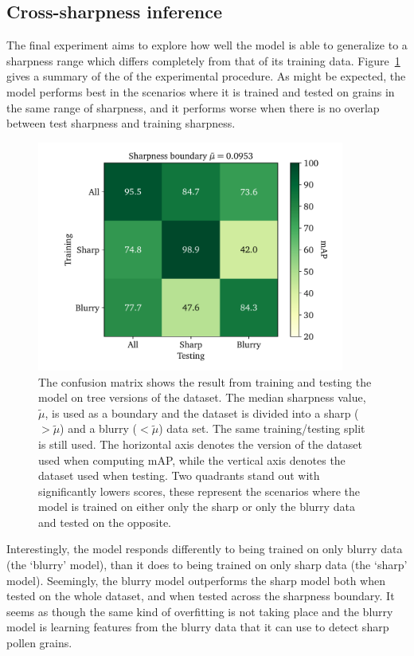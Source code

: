 \subsection{Cross-sharpness inference}
The final experiment aims to explore how well the model is able to generalize to a sharpness range which differs completely from that of its training data.
Figure~\ref{fig:results-sharpness-inference} gives a summary of the of the experimental procedure.
As might be expected, the model performs best in the scenarios where it is trained and tested on grains in the same range of sharpness, and it performs worse when there is no overlap between test sharpness and training sharpness.

\begin{figure}[htbp]
  \centering
  \includegraphics[width=0.9\textwidth]{figs/results/sharpness/confustion_balanced_test_map.pdf}
  \caption[mAP across sharpness boundary]{%
The confusion matrix shows the result from training and testing the model on tree versions of the dataset. 
The median sharpness value, \(\tilde{\mu}\), is used as a boundary and the dataset is divided into a sharp (\(>\tilde{\mu}\)) and a blurry (\(<\tilde{\mu}\)) data set.
The same training/testing split is still used. 
The horizontal axis denotes the version of the dataset used when computing mAP, while the vertical axis denotes the dataset used when testing.
Two quadrants stand out with significantly lowers scores,  these represent the scenarios where the model is trained on either only the sharp or only the blurry data and tested on the opposite.
  }\label{fig:results-sharpness-inference}
\end{figure}

Interestingly, the model responds differently to being trained on only blurry data (the `blurry' model), than it does to being trained on only sharp data (the `sharp' model).
Seemingly, the blurry model outperforms the sharp model both when tested on the whole dataset, and when tested across the sharpness boundary.
It seems as though the same kind of overfitting is not taking place and the blurry model is learning features from the blurry data that it can use to detect sharp pollen grains.

